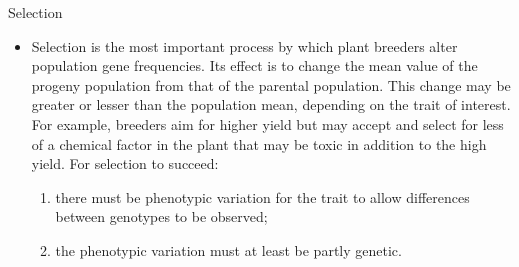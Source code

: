 \documentclass[11pt,dvipsnames,ignorenonframetext,aspectratio=169]{beamer}
\providecommand{\tightlist}{%
  \setlength{\itemsep}{0pt}\setlength{\parskip}{0pt}}
\begin{document}
\begin{frame}{Selection}
\protect\hypertarget{selection}{}

\begin{itemize}
\tightlist
\item
  Selection is the most important process by which plant breeders alter
  population gene frequencies. Its effect is to change the mean value of
  the progeny population from that of the parental population. This
  change may be greater or lesser than the population mean, depending on
  the trait of interest. For example, breeders aim for higher yield but
  may accept and select for less of a chemical factor in the plant that
  may be toxic in addition to the high yield. For selection to succeed:

  \begin{enumerate}
  \tightlist
  \item
    there must be phenotypic variation for the trait to allow
    differences between genotypes to be observed;
  \item
    the phenotypic variation must at least be partly genetic.
  \end{enumerate}
\end{itemize}

\end{frame}
\end{document}
